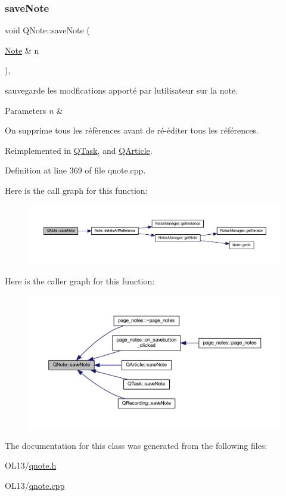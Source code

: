 \subsubsection{\texorpdfstring{save\+Note}{saveNote}}
{\footnotesize\ttfamily void Q\+Note\+::save\+Note (\begin{DoxyParamCaption}\item[{\hyperlink{class_note}{Note} \&}]{n }\end{DoxyParamCaption})\hspace{0.3cm}{\ttfamily [virtual]}, {\ttfamily [slot]}}



sauvegarde les modfications apporté par l\textquotesingle{}utilisateur sur la note. 


\begin{DoxyParams}{Parameters}
{\em n} & \\
\hline
\end{DoxyParams}
On supprime tous les réfèrences avant de ré-\/éditer tous les références. 

Reimplemented in \hyperlink{class_q_task_ae304b097cdfd1169d2b190bbad3922eb}{Q\+Task}, and \hyperlink{class_q_article_ae59d03688947d16b86f9ab10384894ec}{Q\+Article}.



Definition at line 369 of file qnote.\+cpp.

Here is the call graph for this function\+:\nopagebreak
\begin{figure}[H]
\begin{center}
\leavevmode
\includegraphics[width=350pt]{class_q_note_a577f684ef199a17dc468d706b1383581_cgraph}
\end{center}
\end{figure}
Here is the caller graph for this function\+:\nopagebreak
\begin{figure}[H]
\begin{center}
\leavevmode
\includegraphics[width=350pt]{class_q_note_a577f684ef199a17dc468d706b1383581_icgraph}
\end{center}
\end{figure}


The documentation for this class was generated from the following files\+:\begin{DoxyCompactItemize}
\item 
O\+L13/\hyperlink{qnote_8h}{qnote.\+h}\item 
O\+L13/\hyperlink{qnote_8cpp}{qnote.\+cpp}\end{DoxyCompactItemize}
